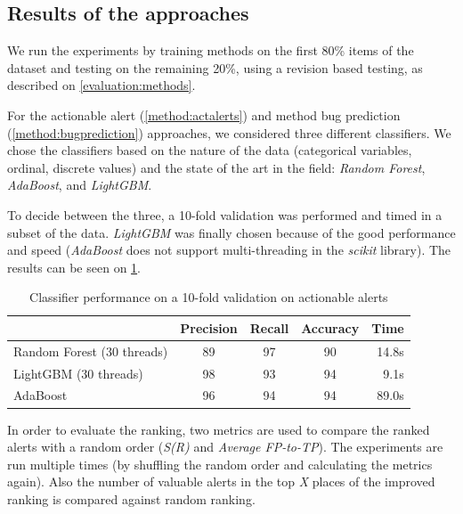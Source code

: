 \subsection{Results of the approaches}
\label{evaluation:results}

We run the experiments by training methods on the first 80\% items of the dataset and testing on the remaining 20\%, using a revision based testing, as described on \cref{evaluation:methods}.

For the actionable alert (\cref{method:actalerts}) and method bug prediction (\cref{method:bugprediction}) approaches, we considered three different classifiers. We chose the classifiers based on the nature of the data (categorical variables, ordinal, discrete values) and the state of the art in the field: \textit{Random Forest}, \textit{AdaBoost}, and \textit{LightGBM}.

To decide between the three, a 10-fold validation was performed and timed in a subset of the data. \textit{LightGBM} was finally chosen because of the good performance and speed (\textit{AdaBoost} does not support multi-threading in the \textit{scikit} library).
The results can be seen on \cref{choosing_classifier}.

\begin{longtable}[c]{@{}lcccr@{}}
	\caption{Classifier performance on a 10-fold validation on actionable alerts}
	\label{choosing_classifier}\\
	\toprule
	& Precision & Recall & Accuracy & Time  \\* \midrule
	\endfirsthead
	\endhead
	\bottomrule
	\endfoot
	\endlastfoot
	Random Forest (30 threads) & 89        & 97     & 90       & 14.8s \\
	LightGBM (30 threads)      & 98        & 93     & 94       & 9.1s  \\
	AdaBoost      & 96        & 94     & 94       & 89.0s   \\* \bottomrule
\end{longtable}


In order to evaluate the ranking, two metrics are used to compare the ranked alerts with a random order (\textit{S(R)} and \textit{Average FP-to-TP}). The experiments are run multiple times (by shuffling the random order and calculating the metrics again). Also the number of valuable alerts in the top \textit{X} places of the improved ranking is compared against random ranking. 

